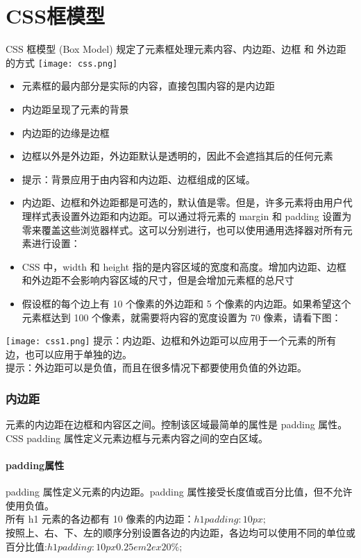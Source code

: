 \documentclass[10pt,UTF8]{ctexart}
\begin{document}
\part{CSS框模型}
CSS 框模型 (Box Model) 规定了元素框处理元素内容、内边距、边框 和 外边距 的方式
\texttt{[image: css.png]} 
\begin{itemize}
\item 元素框的最内部分是实际的内容，直接包围内容的是内边距
\item 内边距呈现了元素的背景
\item 内边距的边缘是边框
\item 边框以外是外边距，外边距默认是透明的，因此不会遮挡其后的任何元素
\item 提示：背景应用于由内容和内边距、边框组成的区域。
\item 内边距、边框和外边距都是可选的，默认值是零。但是，许多元素将由用户代理样式表设置外边距和内边距。可以通过将元素的 margin 和 padding 设置为零来覆盖这些浏览器样式。这可以分别进行，也可以使用通用选择器对所有元素进行设置：
\item CSS 中，width 和 height 指的是内容区域的宽度和高度。增加内边距、边框和外边距不会影响内容区域的尺寸，但是会增加元素框的总尺寸
\item 假设框的每个边上有 10 个像素的外边距和 5 个像素的内边距。如果希望这个元素框达到 100 个像素，就需要将内容的宽度设置为 70 像素，请看下图：
\end{itemize}
\texttt{[image: css1.png]} 
提示：内边距、边框和外边距可以应用于一个元素的所有边，也可以应用于单独的边。\\
提示：外边距可以是负值，而且在很多情况下都要使用负值的外边距。

\section{内边距}
元素的内边距在边框和内容区之间。控制该区域最简单的属性是 padding 属性。CSS padding 属性定义元素边框与元素内容之间的空白区域。
\subsection{padding属性}
padding 属性定义元素的内边距。padding 属性接受长度值或百分比值，但不允许使用负值。\\
所有 h1 元素的各边都有 10 像素的内边距：$h1 {padding: 10px;}$\\
按照上、右、下、左的顺序分别设置各边的内边距，各边均可以使用不同的单位或百分比值:$h1 {padding: 10px 0.25em 2ex 20\%;}$
\end{document}
